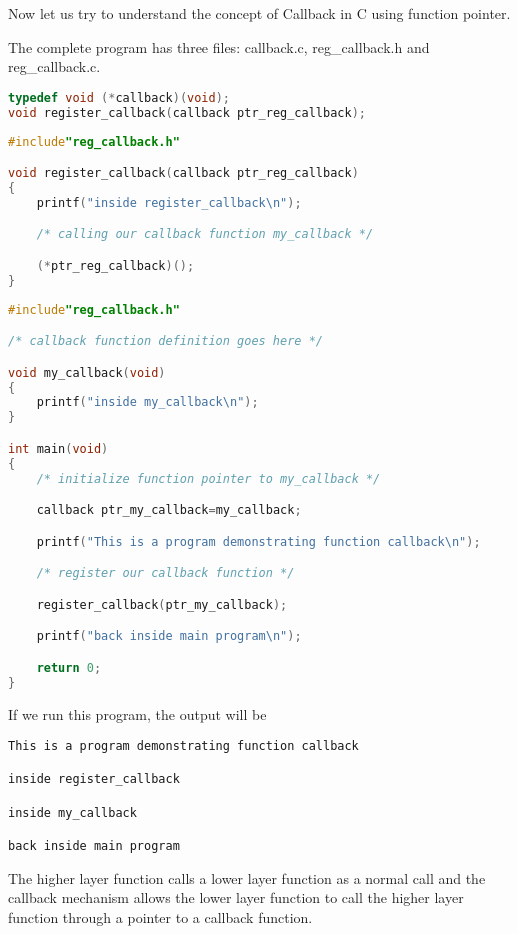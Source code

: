 \documentclass{book}
\begin{document}
Now let us try to understand the concept of Callback in  C using function pointer.

The complete program has three files: callback.c, reg\_callback.h and  reg\_callback.c.
\begin{lstlisting}[caption={reg\_callback.h}, language=C]
typedef void (*callback)(void);
void register_callback(callback ptr_reg_callback);
\end{lstlisting}

\begin{lstlisting}[caption={reg\_callback.c}, language=C]
#include"reg_callback.h"

void register_callback(callback ptr_reg_callback)
{
    printf("inside register_callback\n");

    /* calling our callback function my_callback */

    (*ptr_reg_callback)();                                      
}
\end{lstlisting}
\begin{lstlisting}[caption={callback.c}, language=C]
#include"reg_callback.h"

/* callback function definition goes here */

void my_callback(void)
{
    printf("inside my_callback\n");
}

int main(void)
{
    /* initialize function pointer to my_callback */

    callback ptr_my_callback=my_callback;                              

    printf("This is a program demonstrating function callback\n");

    /* register our callback function */

    register_callback(ptr_my_callback);                                

    printf("back inside main program\n");

    return 0;
}
\end{lstlisting}


If we run this program, the output will be
\begin{Verbatim}
This is a program demonstrating function callback

inside register_callback

inside my_callback

back inside main program
\end{Verbatim}
The higher layer function calls a lower layer function as a normal call and the callback mechanism allows the lower layer function to call the higher layer function 
through a pointer to a callback function.
\end{document}
